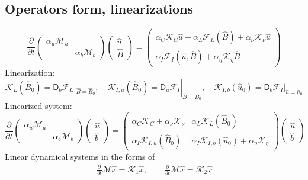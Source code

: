 \subsection{Operators form, linearizations}

\begin{equation}
    \frac{\partial}{\partial t} \begin{pmatrix} \alpha_u \mathcal{M}_u & \\ & \alpha_b \mathcal{M}_b \end{pmatrix}
    \begin{pmatrix} \hat{u} \\ \hat{B} \end{pmatrix} = 
    \begin{pmatrix}
        \alpha_C \mathcal{K}_C \hat{u} + \alpha_L \mathcal{F}_{L}(\hat{B}) + \alpha_\nu \mathcal{K}_\nu \hat{u} \\ 
        \alpha_I \mathcal{F}_{I}(\hat{u}, \hat{B}) + \alpha_\eta \mathcal{K}_\eta \hat{B}
    \end{pmatrix}
\end{equation}
Linearization:
\[
    \mathcal{K}_L(\hat{B}_0) = \mathsf{D}_b \mathcal{F}_L|_{\hat{B} = \hat{B}_0},\quad 
    \mathcal{K}_{I,u}(\hat{B}_0) = \mathsf{D}_u \mathcal{F}_I|_{\hat{B} = \hat{B}_0},\quad 
    \mathcal{K}_{I,b}(\hat{u}_0) = \mathsf{D}_b \mathcal{F}_I|_{\hat{u} = \hat{u}_0}
\]
Linearized system:
\begin{equation}
    \frac{\partial}{\partial t} \begin{pmatrix} \alpha_u \mathcal{M}_u & \\ & \alpha_b \mathcal{M}_b \end{pmatrix}
    \begin{pmatrix} \hat{u} \\ \hat{b} \end{pmatrix} = 
    \begin{pmatrix}
        \alpha_C \mathcal{K}_C + \alpha_\nu \mathcal{K}_\nu & \alpha_L \mathcal{K}_{L}(\hat{B}_0) \\ 
        \alpha_I \mathcal{K}_{I,u}(\hat{B}_0) & \alpha_I \mathcal{K}_{I,b}(\hat{u}_0) + \alpha_\eta \mathcal{K}_\eta
    \end{pmatrix}
    \begin{pmatrix} \hat{u} \\ \hat{b} \end{pmatrix}
\end{equation}
Linear dynamical systems in the forms of 
\[\begin{aligned}
    \frac{\partial}{\partial t}\mathcal{M} \hat{x} = \mathcal{K}_1 \hat{x},\qquad 
    \frac{\partial}{\partial t}\mathcal{M} \hat{x} = \mathcal{K}_2 \hat{x}
\end{aligned}\]
